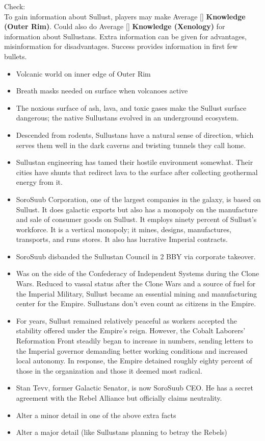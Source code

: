 \documentclass{book}
\newcommand{\df}{\difficulty}
\begin{document}
\begin{multicols}{2}
Check:\\
    To gain information about Sullust, players may make Average [\df\df] \textbf{Knowledge (Outer Rim)}. Could also do Average [\df\df] \textbf{Knowledge (Xenology)} for information about Sullustans. Extra information can be given for advantages, misinformation for disadvantages. Success provides information in first few bullets.\\
\begin{itemize}
    \item Volcanic world on inner edge of Outer Rim
    \item Breath masks needed on surface when volcanoes active
    \item The noxious surface of ash, lava, and toxic gases make the Sullust surface dangerous; the native Sullustans evolved in an underground ecosystem.
    \item \advantage Descended from rodents, Sullustans have a natural sense of direction, which serves them well in the dark caverns and twisting tunnels they call home.
    \item \advantage  Sullustan engineering has tamed their hostile environment somewhat. Their cities have shunts that redirect lava to the surface after collecting geothermal energy from it.
   \item \advantage SoroSuub Corporation, one of the largest companies in the galaxy, is based on Sullust. It does galactic exports but also has a monopoly on the manufacture and sale of consumer goods on Sullust. It employs ninety percent of Sullust’s workforce. It is a vertical monopoly; it mines, designs, manufactures, transports, and runs stores. It also has lucrative Imperial contracts.
	\item \advantage SoroSuub disbanded the Sullustan Council in 2 BBY via corporate takeover.
    \item \advantage Was on the side of the Confederacy of Independent Systems during the Clone Wars. Reduced to vassal status after the Clone Wars and a source of fuel for the Imperial Military, Sullust became an essential mining and manufacturing center for the Empire. Sullustans don’t even count as citizens in the Empire.
    \item \advantage For years, Sullust remained relatively peaceful as workers accepted the stability offered under the Empire's reign. However, the Cobalt Laborers' Reformation Front steadily began to increase in numbers, sending letters to the Imperial governor demanding better working conditions and increased local autonomy. In response, the Empire detained roughly eighty percent of those in the organization and those it deemed most radical.
    \item \triumph Stan Tevv, former Galactic Senator, is now SoroSuub CEO.  He has a secret agreement with the Rebel Alliance but officially claims neutrality.
    \item \threat Alter a minor detail in one of the above extra facts
    \item \despair Alter a major detail (like Sullustans planning to betray the Rebels)
\end{itemize}




\end{multicols}
\end{document}

